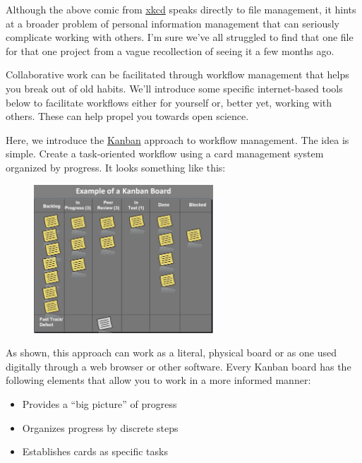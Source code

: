 \documentclass[
  letterpaper,
  DIV=11,
  numbers=noendperiod]{scrreprt}
\providecommand{\tightlist}{%
  \setlength{\itemsep}{0pt}\setlength{\parskip}{0pt}}\usepackage{longtable,booktabs,array}
\begin{document}
Although the above comic from \href{https://xkcd.com/}{xkcd} speaks
directly to file management, it hints at a broader problem of personal
information management that can seriously complicate working with
others. I'm sure we've all struggled to find that one file for that one
project from a vague recollection of seeing it a few months ago.

Collaborative work can be facilitated through workflow management that
helps you break out of old habits. We'll introduce some specific
internet-based tools below to facilitate workflows either for yourself
or, better yet, working with others. These can help propel you towards
open science.

Here, we introduce the
\href{https://en.wikipedia.org/wiki/Kanban_(development)}{Kanban}
approach to workflow management. The idea is simple. Create a
task-oriented workflow using a card management system organized by
progress. It looks something like this:

\begin{figure}

{\centering \includegraphics[width=0.6\textwidth,height=\textheight]{./img/kanban.jpg}

}

\end{figure}

As shown, this approach can work as a literal, physical board or as one
used digitally through a web browser or other software. Every Kanban
board has the following elements that allow you to work in a more
informed manner:

\begin{itemize}
\tightlist
\item
  Provides a ``big picture'' of progress
\item
  Organizes progress by discrete steps
\item
  Establishes cards as specific tasks
\end{itemize}
\end{document}
